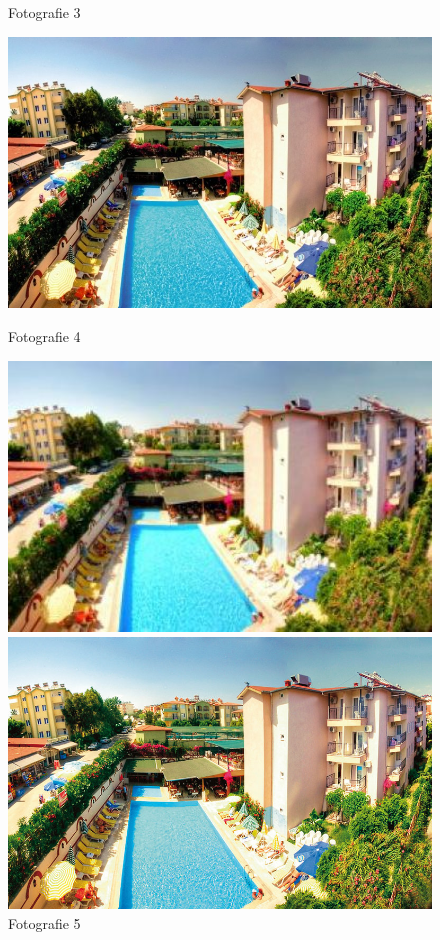 \begin{figure}[!htb]
	\caption{Fotografie 3}\label{fig:img03}
	\endminipage\hfill
	\includegraphics[width=\linewidth]{graphics/kop/aa04.png}
	\caption{Fotografie 4}\label{fig:img04}
	\endminipage\hfill
	\includegraphics[width=\linewidth]{graphics/kop/aa05.png}
	\caption{Fotografie 5}\label{fig:img05}
	\endminipage\hfill
	\includegraphics[width=\linewidth]{graphics/kop/aa06.png}

\end{figure}
